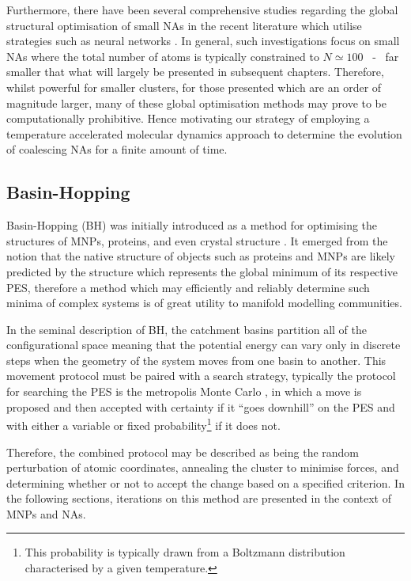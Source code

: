 Furthermore, there have been several comprehensive studies regarding the global structural optimisation of small NAs in the recent literature \cite{Heard2017} which utilise strategies such as neural networks \cite{Han2022-ln,C6CP00342G}. In general, such investigations focus on small NAs where the total number of atoms is typically constrained to $N\simeq100$ ~-~ far smaller that what will largely be presented in subsequent chapters. Therefore, whilst powerful for smaller clusters, for those presented which are an order of magnitude larger, many of these global optimisation methods may prove to be computationally prohibitive. Hence motivating our strategy of employing a temperature accelerated molecular dynamics approach to determine the evolution of coalescing NAs for a finite amount of time.


\subsection{Basin-Hopping}
\label{sec:bh}
Basin-Hopping (BH) was initially introduced as a method for optimising the structures of MNPs, proteins, and even crystal structure \cite{Wales1999-dv}. It emerged from the notion that the native structure of objects such as proteins and MNPs are likely predicted by the structure which represents the global minimum of its respective PES, therefore a method which may efficiently and reliably determine such minima of complex systems is of great utility to manifold modelling communities. 

In the seminal description of BH, the catchment basins partition all of the configurational space meaning that the potential energy can vary only in discrete steps when the geometry of the system moves from one basin to another. This movement protocol must be paired with a search strategy, typically the protocol for searching the PES is the metropolis Monte Carlo , in which a move is proposed and then accepted with certainty if it ``goes downhill'' on the PES and with either a variable or fixed probability\footnote{This probability is typically drawn from a Boltzmann distribution characterised by a given temperature.} if it does not.

Therefore, the combined protocol may be described as being the random perturbation of atomic coordinates, annealing the cluster to minimise forces, and determining whether or not to accept the change based on a specified criterion. In the following sections, iterations on this method are presented in the context of MNPs and NAs.

